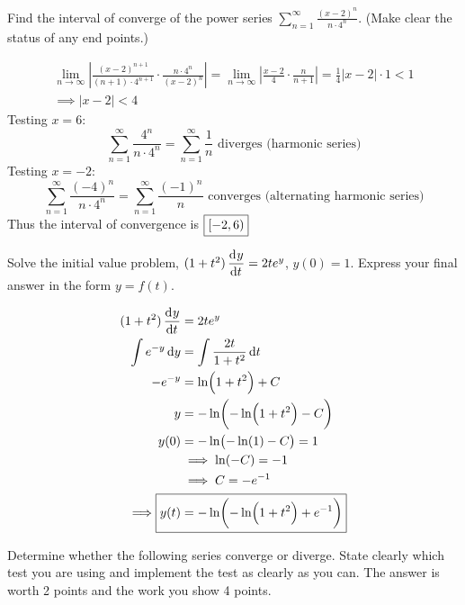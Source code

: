\documentclass[12pt,answers]{exam}
\begin{document}
\begin{questions}
\newpage
\question[12]
Find the interval of converge of the power series $\displaystyle \sum_{n=1}^\infty \frac{(x-2)^n}{n \cdot 4^n}$.
(Make clear the status of any end points.)
\begin{solution}
    \begin{align*}
    \lim_{n\to\infty} \left| \frac{(x-2)^{n+1}}{(n+1) \cdot 4^{n+1}} \cdot \frac{n\cdot 4^n}{(x-2)^n}\right|
    = \lim_{n\to\infty} \left| \frac{x-2}{4} \cdot \frac{n}{n+1} \right|
    = \frac14 |x-2| \cdot 1 < 1 \\ 
    \implies |x-2| < 4
    \end{align*}
    Testing $x = 6$:
    \[
        \sum_{n=1}^\infty \frac{4^n}{n \cdot 4^n} 
        = \sum_{n=1}^\infty \frac{1}{n} \text{ diverges (harmonic series)}
    \]
    Testing $x = -2$:
    \[
        \sum_{n=1}^\infty \frac{(-4)^n}{n \cdot 4^n} = \sum_{n=1}^\infty \frac{(-1)^n}{n} \text{ converges (alternating harmonic series)}
    \]
    Thus the interval of convergence is $\boxed{\intco{-2, 6}}$
\end{solution}

\question[12]
Solve the initial value problem, $(1+t^2) \dod{y}{t} = 2t e^y$, $y(0) = 1$. 
Express your final answer in the form $y = f(t)$.
\begin{solution}
    \begin{align*}
        (1+t^2) \dod{y}{t} &= 2t e^y \\ 
        \int e^{-y} \dif y &= \int \frac{2t}{1+t^2} \dif t \\ 
        -e^{-y} &= \ln(1+t^2) + C \\ 
        y &= -\ln(-\ln(1+t^2) - C) \\ 
        y(0) &= -\ln(-\ln(1) - C) = 1 \\ 
        &\implies \ln(-C) = -1 \\ 
        &\implies C = -e^{-1} \\ 
        \implies \Aboxed{y(t) &= -\ln(-\ln(1+t^2) + e^{-1})}
    \end{align*}
\end{solution}

\question
Determine whether the following series converge or diverge.
State clearly which test you are using and implement the test as clearly as you can.
The answer is worth 2 points and the work you show 4 points.
\end{questions}
\end{document}
